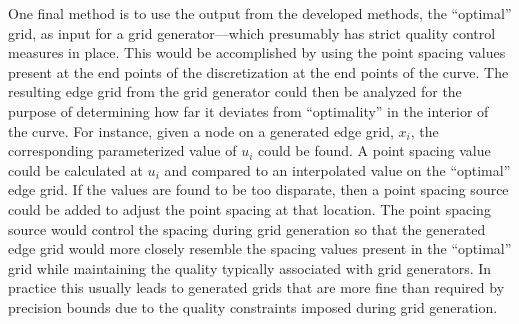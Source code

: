         One final method is to use the output from the developed methods, the “optimal” grid, as input for a grid generator—which presumably has strict quality control measures in place.  This would be accomplished by using the point spacing values present at the end points of the discretization at the end points of the curve.  The resulting edge grid from the grid generator could then be analyzed for the purpose of determining how far it deviates from “optimality” in the interior of the curve.  For instance, given a node on a generated edge grid, $x_i$, the corresponding parameterized value of $u_i$ could be found.  A point spacing value could be calculated at $u_i$ and compared to an interpolated value on the “optimal” edge grid.  If the values are found to be too disparate, then a point spacing source could be added to adjust the point spacing at that location.  The point spacing source would control the spacing during grid generation so that the generated edge grid would more closely resemble the spacing values present in the “optimal” grid while maintaining the quality typically associated with grid generators. In practice this usually leads to generated grids that are more fine than required by precision bounds due to the quality constraints imposed during grid generation.

